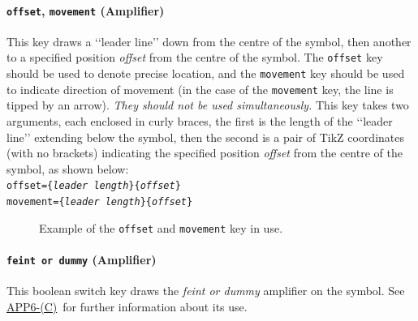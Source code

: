 \documentclass[a4paper, titlepage]{article}
\newcommand\DocLink{\href{https://www.awl.edu.pl/images/en/APP_6_C.pdf}{APP6-(C)}}
\begin{document}
\paragraph{\texttt{offset}, \texttt{movement} (Amplifier)}

This key draws a \lq\lq{}leader line\rq\rq{} down from the centre of the symbol, then another to a specified position \textit{offset} from the centre of the symbol. The \texttt{offset} key should be used to denote precise location, and the \texttt{movement} key should be used to indicate direction of movement (in the case of the \texttt{movement} key, the line is tipped by an arrow). \textit{They should not be used simultaneously.} This key takes two arguments, each enclosed in curly braces, the first is the length of the \lq\lq{}leader line\rq\rq{} extending below the symbol, then the second is a pair of TikZ coordinates (with no brackets) indicating the specified position \textit{offset} from the centre of the symbol, as shown below:\\

\texttt{offset=\{\textit{leader length}\}\{\textit{offset}\}}\\
\indent\texttt{movement=\{\textit{leader length}\}\{\textit{offset}\}}

\begin{figure}[H]
\centering
{}
\caption{Example of the \texttt{offset} and \texttt{movement}  key in use.}
\end{figure}

\paragraph{\texttt{feint or dummy} (Amplifier)}

This boolean switch key draws the \textit{feint or dummy} amplifier on the symbol. See \DocLink\ for further information about its use.
\end{document}
